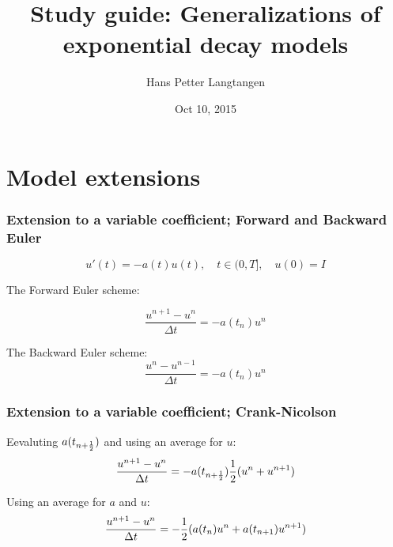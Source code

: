 \documentclass{beamer}
\begin{document}








\title{Study guide: Generalizations of exponential decay models}


\author{Hans Petter Langtangen}

\date{Oct 10, 2015
}

\begin{frame}
\titlepage
\end{frame}

\section{Model extensions}
\label{decay:generalizations}

\begin{frame}
\frametitle{Extension to a variable coefficient; Forward and Backward Euler}

\begin{equation}
u'(t) = -a(t)u(t),\quad t\in (0,T],\quad u(0)=I
\label{decay:problem:a}
\end{equation}


The Forward Euler scheme:

\begin{equation}
\frac{u^{n+1} - u^n}{\Delta t} = -a(t_n)u^n
\end{equation}

The Backward Euler scheme:
\begin{equation}
\frac{u^{n} - u^{n-1}}{\Delta t} = -a(t_n)u^n
\end{equation}
\end{frame}

\begin{frame}
\frametitle{Extension to a variable coefficient; Crank-Nicolson}

Eevaluting $a(t_{n+\half})$ and
using an average for $u$:
\begin{equation}
\frac{u^{n+1} - u^{n}}{\Delta t} = -a(t_{n+\half})\half(u^n + u^{n+1})
\end{equation}

Using an average for $a$ and $u$:
\begin{equation}
\frac{u^{n+1} - u^{n}}{\Delta t} = -\half(a(t_n)u^n + a(t_{n+1})u^{n+1})
\end{equation}
\end{frame}
\end{document}
